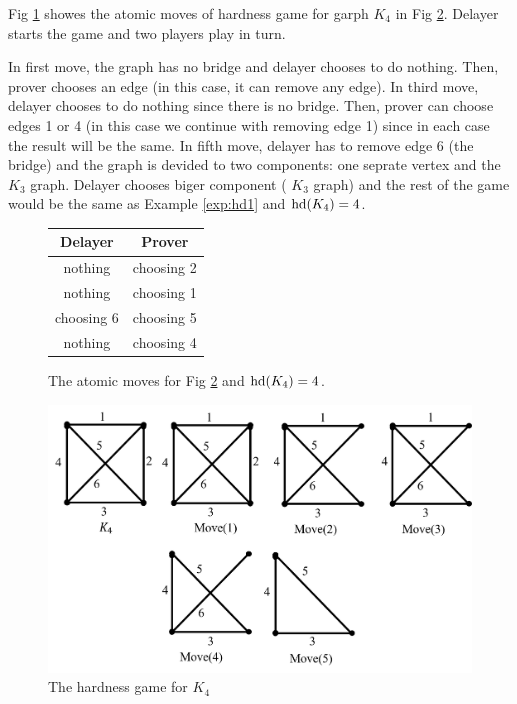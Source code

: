 \documentclass[]{book}
\begin{document}
\begin{examp}\label{exp:hd2}
       Fig \ref{fig:game2} showes the atomic moves of hardness game for garph $K_4$ in Fig \ref{fig:hd2}. Delayer starts the game and two 
	   players play in turn. 
	   
	   In first move, the graph has no bridge and delayer chooses to do nothing. Then, prover chooses an edge (in this case, it can remove any edge). 
	   In third move, delayer chooses to do nothing since there is no bridge. Then, prover can choose edges 1 or 4 (in this case we continue with removing edge 1) since in each case 
	   the result will be the same. In fifth move, delayer has to remove edge 6 (the bridge) and the graph is devided to two components: 
	   one seprate vertex and the $K_3$ graph. Delayer chooses biger component ( $K_3$ graph) and the rest of the game would be the same as Example \ref{exp:hd1} and $\operatorname{hd}(K_4)=4$.
	 
	 \begin{figure}[h]
      \centering
      \begin{tabular}{|c|c|} 
      \hline
                  Delayer & Prover \\ \hline
                  nothing & choosing 2  \\ \hline
                  nothing & choosing 1  \\ \hline
                  choosing 6 & choosing 5  \\ \hline
                  nothing & choosing 4 \\ \hline
      \end{tabular}
      \caption{The atomic moves for Fig \ref{fig:hd2} and  $\operatorname{hd}(K_4)=4$.}
      \label{fig:game2}
      \end{figure}
	  \begin{figure}
      \begin{center}
      \includegraphics[scale =0.6]{g2.png}
      \caption{The hardness game for $K_4$}
	  \label{fig:hd2}
      \end{center}
      \end{figure}
	   
\end{examp}
\end{document}
